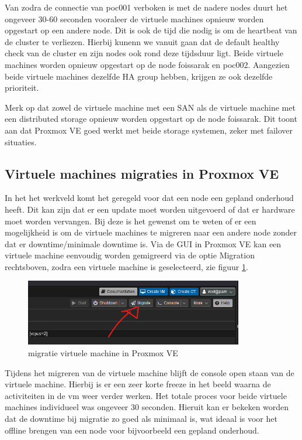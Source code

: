 Van zodra de connectie van poc001 verboken is met de nadere nodes duurt het ongeveer 30-60 seconden vooraleer de virtuele machines opnieuw worden opgestart op een andere node. Dit is ook de tijd die nodig is om de heartbeat van de cluster te verliezen.
Hierbij kunenn we vanuit gaan dat de default healthy check van de cluster en zijn nodes ook rond deze tijdsduur ligt. Beide virtuele machines worden opnieuw opgestart op de node foissarak en poc002. 
Aangezien beide virtuele machines dezelfde HA group hebben, krijgen ze ook dezelfde prioriteit.

Merk op dat zowel de virtuele machine met een SAN als de virtuele machine met een distributed storage opnieuw worden opgestart op de node foissarak. Dit toont aan dat Proxmox VE goed werkt met beide storage systemen, zeker met failover situaties.


\subsection{Virtuele machines migraties in Proxmox VE}
In het het werkveld komt het geregeld voor dat een node een gepland onderhoud heeft. Dit kan zijn dat er een update moet worden uitgevoerd of dat er hardware moet worden vervangen.
Bij deze is het gewenst om te weten of er een mogelijkheid is om de virtuele machines te migreren naar een andere node zonder dat er downtime/minimale downtime is.
Via de GUI in Proxmox VE kan een virtuele machine eenvoudig worden gemigreerd via de optie Migration rechtsboven, zodra een virtuele machine is geselecteerd, zie figuur \ref{fig:migratie-vm}.
\begin{figure}[H]
  \centering
  \includegraphics[width=0.85\textwidth]{../poc/vm-migratie-prox.png}
  \caption{migratie virtuele machine in Proxmox VE}
  \label{fig:migratie-vm}
\end{figure}
Tijdens het migreren van de virtuele machine blijft de console open staan van de virtuele machine. Hierbij is er een zeer korte freeze in het beeld waarna de activiteiten in de vm weer verder werken. Het totale proces voor beide virtuele machines individueel was ongeveer 30 seconden.
Hieruit kan er bekeken worden dat de downtime bij migratie zo goed als minimaal is, wat ideaal is voor het offline brengen van een node voor bijvoorbeeld een gepland onderhoud.


